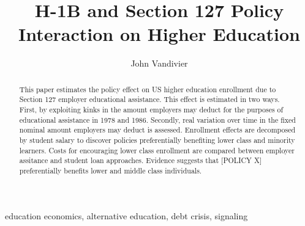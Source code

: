 \documentclass[review]{elsarticle}
\begin{document}
\begin{frontmatter}

\title{
    H-1B and Section 127 Policy Interaction on Higher Education
}
\tnotetext[titlenotes]{
}

\author[mymainaddress]{John Vandivier} %
\address[mymainaddress]{4400 University Dr, Fairfax, VA 22030}

\begin{abstract}
    This paper estimates the policy effect on US higher education enrollment due to Section 127 employer educational assistance.
    This effect is estimated in two ways.
    First, by exploiting kinks in the amount employers may deduct for the purposes of educational assistance in 1978 and 1986.
    Secondly, real variation over time in the fixed nominal amount employers may deduct is assessed.
    Enrollment effects are decomposed by student salary to discover policies preferentially benefiting lower class and minority learners.
    Costs for encouraging lower class enrollment are compared between employer assitance and student loan approaches.
    Evidence suggests that [POLICY X] preferentially benefits lower and middle class individuals.
\end{abstract}

\begin{keyword}
education economics, alternative education, debt crisis, signaling
\MSC[2010] %
\end{keyword}

\end{frontmatter}
\end{document}
